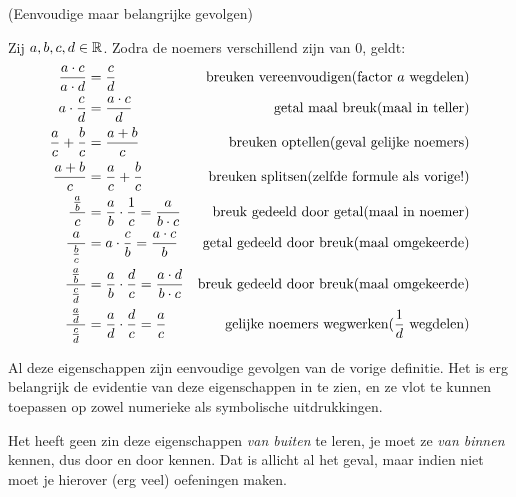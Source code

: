 \documentclass[numbers]{ximera}
\begin{document}
\begin{proposition} (Eenvoudige maar belangrijke gevolgen)
	
	Zij $a,b,c,d\in \mathbb{R}$. Zodra de noemers verschillend zijn van $0$, geldt:
{
\savebox{}   %
\begin{align*}
		\frac{a\cdot c}{a\cdot d} &= \frac{c}{d} 
			& \text{breuken vereenvoudigen} \hfill\text{(factor $a$ wegdelen)} \\
		a\cdot \frac{c}{d}   &= \frac{a\cdot c}{d} 
			& \text{getal maal breuk}\hfill \text{(maal in teller)} \\
		\frac{a}{c}+\frac{b}{c}  &= \frac{a+b}{c} 
			& \text{breuken optellen}\hfill\text{(geval gelijke noemers)} \\
		\frac{a+b}{c} &= \frac{a}{c}+\frac{b}{c}  
			& \text{breuken splitsen} \hfill\text{(zelfde formule als vorige!)}\\
		\frac{\frac{a}{b}}{\ c\ } &= \frac ab \cdot \frac 1c = \frac{a}{b\cdot c} 
		& \text{breuk gedeeld door getal}\hfill\text{(maal in noemer)}\\
		\frac{a}{\ \frac{b}{c}\ } &= a\cdot \frac cb = \frac{a\cdot c}{b}
		& \text{getal gedeeld door breuk}\hfill\text{(maal omgekeerde)}\\
		\frac{\frac{a}{b}}{\ \frac{c}{d}\ } &= \frac ab \cdot \frac dc =  \frac{a\cdot d}{b\cdot c}
		& \text{breuk gedeeld door breuk}\hfill\text{(maal omgekeerde)}\\
		\frac{\frac{a}{d}}{\ \frac{c}{d}\ } &= \frac ad \cdot \frac dc =  \frac{a}{c}
		& \text{gelijke noemers wegwerken}\hfill\text{($\frac 1d$ wegdelen)}\\
		\end{align*}
}
\end{proposition}


Al deze eigenschappen zijn eenvoudige gevolgen van de vorige definitie. Het is erg belangrijk de evidentie van deze eigenschappen in te zien, en ze vlot te kunnen toepassen op zowel numerieke als symbolische uitdrukkingen.

Het heeft geen zin deze eigenschappen \textit{van buiten} te leren, je moet ze \textit{van binnen} kennen, dus door en door kennen. Dat is allicht al het geval, maar indien niet moet je hierover (erg veel) oefeningen maken.
\end{document}
